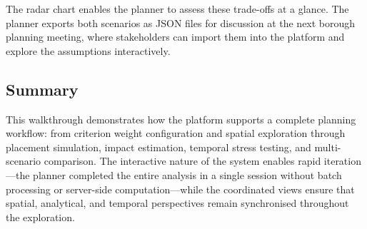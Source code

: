 \noindent The radar chart enables the planner to assess these trade-offs at a glance. The planner exports both scenarios as JSON files for discussion at the next borough planning meeting, where stakeholders can import them into the platform and explore the assumptions interactively.

\subsection{Summary}
\label{sec:uc-summary}

This walkthrough demonstrates how the platform supports a complete planning workflow: from criterion weight configuration and spatial exploration through placement simulation, impact estimation, temporal stress testing, and multi-scenario comparison. The interactive nature of the system enables rapid iteration---the planner completed the entire analysis in a single session without batch processing or server-side computation---while the coordinated views ensure that spatial, analytical, and temporal perspectives remain synchronised throughout the exploration.
